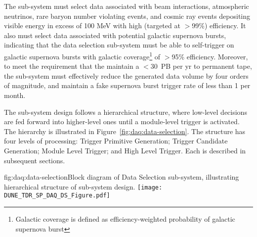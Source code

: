 The sub-system must select data associated with beam
interactions, atmospheric neutrinos, rare baryon number violating events,
and cosmic ray events depositing visible energy in excess of 100 MeV
with high (targeted at $>$99\%) efficiency. It also must select data
associated with potential galactic supernova bursts, indicating that
the data selection sub-system must be able to self-trigger on
galactic supernova bursts with galactic coverage\footnote{Galactic
  coverage is defined as efficiency-weighted probability of galactic supernova
burst} of $>$95\% efficiency. Moreover, to meet the
requirement that the   maintain a $<$30~PB per yr to permanent
tape, the  sub-system must effectively reduce the generated data
volume by four orders of magnitude,  and maintain a fake supernova
burst trigger rate of less than \num{1}  per month.

The  sub-system design follows a hierarchical structure, where low-level
decisions are fed forward into higher-level ones until a  module-level trigger is activated. The hierarchy
is illustrated in Figure~\ref{fig:daq:data-selection}. The structure
has four levels of processing: Trigger Primitive Generation;
Trigger Candidate Generation; Module Level Trigger; and High Level
Trigger. Each is described in subsequent sections.

\begin{dunefigure}{fig:daq:data-selection}{Block diagram of  
    Data Selection sub-system, illustrating hierarchical structure of
    sub-system design.}
  \texttt{[image: DUNE\_TDR\_SP\_DAQ\_DS\_Figure.pdf]}
\end{dunefigure}

